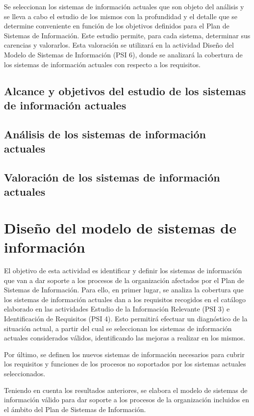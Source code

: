 \documentclass[12pt,a4paper,spanish,twoside]{book}
\begin{document}
\begin{enumerate}
\begin{itemize}
Se seleccionan los
sistemas de información actuales que son objeto del análisis y se lleva a
cabo el estudio de los mismos con la profundidad y el detalle que se
determine conveniente en función de los objetivos definidos para el Plan de
Sistemas de Información. Este estudio permite, para cada sistema, determinar
sus carencias y valorarlos. Esta valoración se utilizará en la actividad
Diseño del Modelo de Sistemas de Información (PSI 6), donde se analizará la
cobertura de los sistemas de información actuales con respecto a los
requisitos.

\section{Alcance y objetivos del estudio de los sistemas de 
  información actuales} 

\section{Análisis de los sistemas de información actuales}

\section{Valoración de los sistemas de información actuales}


\chapter{Diseño del modelo de sistemas de información}
El objetivo de esta actividad es identificar y definir los sistemas de
información que van a dar soporte a los procesos de la organización afectados
por el Plan de Sistemas de Información. Para ello, en primer lugar, se
analiza la cobertura que los sistemas de información actuales dan a los
requisitos recogidos en el catálogo elaborado en las actividades Estudio de
la Información Relevante (PSI 3) e Identificación de Requisitos (PSI 4). Esto
permitirá efectuar un diagnóstico de la situación actual, a partir del cual
se seleccionan los sistemas de información actuales considerados válidos,
identificando las mejoras a realizar en los mismos. 

Por último, se definen los nuevos sistemas de información necesarios para
cubrir los requisitos y funciones de los procesos no soportados por los
sistemas actuales seleccionados. 

Teniendo en cuenta los resultados anteriores, se elabora el modelo de
sistemas de información válido para dar soporte a los procesos de la
organización incluidos en el ámbito del Plan de Sistemas de Información. 


\end{itemize}
\end{enumerate}
\end{document}
